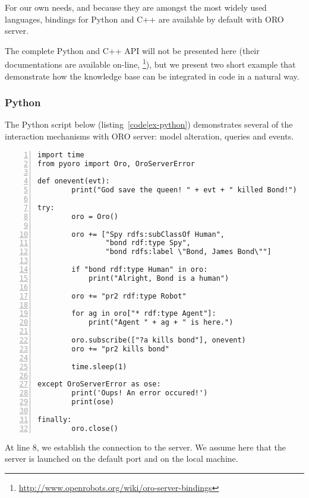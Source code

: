For our own needs, and because they are amongst the most widely used languages,
bindings for Python and C++ are available by default with ORO server.

The complete Python and C++ API will not be presented here (their
documentations are available on-line,
\footnote{\url{http://www.openrobots.org/wiki/oro-server-bindings}}), but we
present two short example that demonstrate how the knowledge base can be
integrated in code in a natural way.

\subsubsection{Python}
\label{sect|python-bindings}

The Python script below (listing~\ref{code|ex-python}) demonstrates several of
the interaction mechanisms with ORO server: model alteration, queries and events.

\lstset{language=python}
\begin{lstlisting}[numbers=left,
                   caption=Example of interaction with {\tt oro-server} in Python, 
                   label = code|ex-python,
                   morekeywords={as}]
import time
from pyoro import Oro, OroServerError

def onevent(evt):
        print("God save the queen! " + evt + " killed Bond!")

try:
        oro = Oro()

        oro += ["Spy rdfs:subClassOf Human", 
                "bond rdf:type Spy", 
                "bond rdfs:label \"Bond, James Bond\""]

        if "bond rdf:type Human" in oro:
            print("Alright, Bond is a human")

        oro += "pr2 rdf:type Robot"

        for ag in oro["* rdf:type Agent"]:
            print("Agent " + ag + " is here.")

        oro.subscribe(["?a kills bond"], onevent)
        oro += "pr2 kills bond"

        time.sleep(1)

except OroServerError as ose:
        print('Oups! An error occured!')
        print(ose)

finally:
        oro.close()
\end{lstlisting}

At line 8, we establish the connection to the server. We assume here that the
server is launched on the default port and on the local machine.


